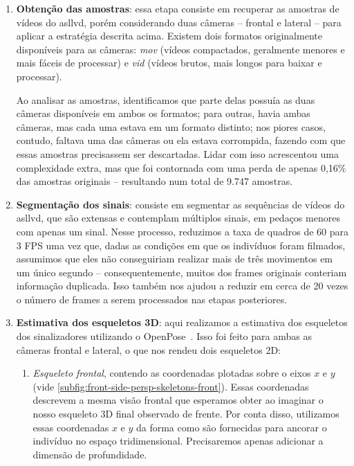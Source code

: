 \begin{enumerate}
    \item \textbf{Obtenção das amostras}: essa etapa consiste em recuperar as amostras de vídeos do \acrshort{asllvd}, porém considerando duas câmeras -- frontal e lateral -- para aplicar a estratégia descrita acima. Existem dois formatos originalmente disponíveis para as câmeras: \textit{mov} (vídeos compactados, geralmente menores e mais fáceis de processar) e \textit{vid} (vídeos brutos, mais longos para baixar e processar).

          Ao analisar as amostras, identificamos que parte delas possuía as duas câmeras disponíveis em ambos os formatos; para outras, havia ambas câmeras, mas cada uma estava em um formato distinto; nos piores casos, contudo, faltava uma das câmeras ou ela estava corrompida, fazendo com que essas amostras precisassem ser descartadas. Lidar com isso acrescentou uma complexidade extra, mas que foi contornada com uma perda de apenas 0,16\% das amostras originais -- resultando num total de 9.747 amostras.

    \item \textbf{Segmentação dos sinais}: consiste em segmentar as sequências de vídeos do \acrshort{asllvd}, que são extensas e contemplam múltiplos sinais, em pedaços menores com apenas um sinal. Nesse processo, reduzimos a taxa de quadros de 60 para 3 FPS uma vez que, dadas as condições em que os indivíduos foram filmados, assumimos que eles não conseguiriam realizar mais de três movimentos em um único segundo -- consequentemente, muitos dos frames originais conteriam informação duplicada. Isso também nos ajudou a reduzir em cerca de 20 vezes o número de frames a serem processados nas etapas posteriores.

    \item \textbf{Estimativa dos esqueletos 3D}: aqui realizamos a estimativa dos esqueletos dos sinalizadores utilizando o OpenPose~\cite{cao-2017-openpose,simon-2017-openpose-hand-face}. Isso foi feito para ambas as câmeras frontal e lateral, o que nos rendeu dois esqueletos 2D:

          \begin{enumerate}
              \item \textit{Esqueleto frontal}, contendo as coordenadas plotadas sobre o eixos \(x\) e \(y\) (vide \autoref{subfig:front-side-persp-skeletons-front}).
                    Essas coordenadas descrevem a mesma visão frontal que esperamos obter ao imaginar o nosso esqueleto 3D final observado de frente. Por conta disso, utilizamos essas coordenadas \(x\) e \(y\) da forma como são fornecidas para ancorar o indivíduo no espaço tridimensional. Precisaremos apenas adicionar a dimensão de profundidade.


\end{enumerate}
\end{enumerate}
